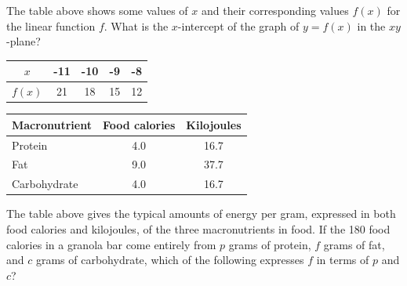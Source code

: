 
\newpage



\noindent\markforreview

\vspace{1em}

The table above shows some values of \( x \) and their corresponding values \( f(x) \) for the linear function \( f \). What is the \( x \)-intercept of the graph of \( y = f(x) \) in the \( xy \)-plane?

\begin{center}
\begin{tabular}{|c|c|c|c|c|}
\hline
$x$ & -11 & -10 & -9 & -8 \\
\hline
$f(x)$ & 21 & 18 & 15 & 12 \\
\hline
\end{tabular}
\end{center}

\vspace{0.75em}



\newpage
\noindent\markforreview

\vspace{1em}

\begin{center}
\begin{tabular}{|l|c|c|}
\hline
\textbf{Macronutrient} & \textbf{Food calories} & \textbf{Kilojoules} \\
\hline
Protein     & 4.0 & 16.7 \\
Fat         & 9.0 & 37.7 \\
Carbohydrate & 4.0 & 16.7 \\
\hline
\end{tabular}
\end{center}

The table above gives the typical amounts of energy per gram, expressed in both food calories and kilojoules, of the three macronutrients in food. If the 180 food calories in a granola bar come entirely from \( p \) grams of protein, \( f \) grams of fat, and \( c \) grams of carbohydrate, which of the following expresses \( f \) in terms of \( p \) and \( c \)?

\vspace{0.75em}


